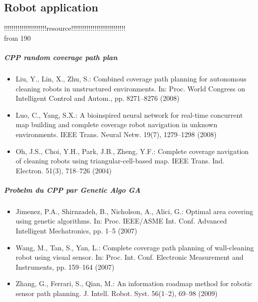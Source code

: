 \subsection{Robot application}
	
	
	!!!!!!!!!!!!!!!!!!!!!!resource!!!!!!!!!!!!!!!!!!!!!!!!!!!!\\ 
	from 190
	\subparagraph{CPP random coverage  path plan}
	\begin{itemize}
	\item Liu, Y., Lin, X., Zhu, S.: Combined coverage path planning for autonomous cleaning robots in unstructured environments. In: Proc. World Congress on Intelligent Control and Autom., pp. 8271–8276 (2008) 

	\item Luo, C., Yang, S.X.: A bioinspired neural network for
real-time concurrent map building and complete coverage robot navigation in unknown environments. IEEE
Trans. Neural Netw. 19(7), 1279–1298 (2008)
	
	\item Oh, J.S., Choi, Y.H., Park, J.B., Zheng, Y.F.: Complete coverage navigation of cleaning robots using
triangular-cell-based map. IEEE Trans. Ind. Electron. 51(3), 718–726 (2004)
	\end{itemize}
\subparagraph{Probelm du CPP par Genetic Algo GA }	
\begin{itemize}
	\item Jimenez, P.A., Shirnzadeh, B., Nicholson, A., Alici, G.: Optimal area covering using genetic algorithms. In: Proc. IEEE/ASME Int. Conf. Advanced Intelligent Mechatronics, pp. 1–5 (2007)
	
	\item Wang, M., Tan, S., Yan, L.: Complete coverage path planning of wall-cleaning robot using visual sensor. In: Proc. Int. Conf. Electronic Measurement and
Instruments, pp. 159–164 (2007)

	\item Zhang, G., Ferrari, S., Qian, M.: An information
roadmap method for robotic sensor path planning. J. Intell. Robot. Syst. 56(1–2), 69–98 (2009)
	\end{itemize}



